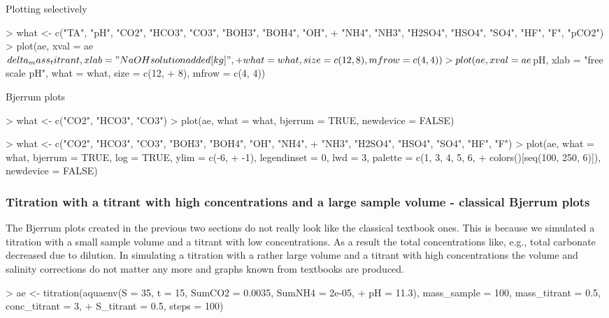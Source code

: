 \documentclass[article,nojss]{jss}
\begin{document}
Plotting selectively
\begin{Schunk}
\begin{Sinput}
> what <- c("TA", "pH", "CO2", "HCO3", "CO3", "BOH3", "BOH4", "OH", 
+     "NH4", "NH3", "H2SO4", "HSO4", "SO4", "HF", "F", "pCO2")
> plot(ae, xval = ae$delta_mass_titrant, xlab = "NaOH solution added [kg]", 
+     what = what, size = c(12, 8), mfrow = c(4, 4))
> plot(ae, xval = ae$pH, xlab = "free scale pH", what = what, size = c(12, 
+     8), mfrow = c(4, 4))
\end{Sinput}
\end{Schunk}

Bjerrum plots
\begin{Schunk}
\begin{Sinput}
> what <- c("CO2", "HCO3", "CO3")
> plot(ae, what = what, bjerrum = TRUE, newdevice = FALSE)
\end{Sinput}
\end{Schunk}

\begin{Schunk}
\begin{Sinput}
> what <- c("CO2", "HCO3", "CO3", "BOH3", "BOH4", "OH", "NH4", 
+     "NH3", "H2SO4", "HSO4", "SO4", "HF", "F")
> plot(ae, what = what, bjerrum = TRUE, log = TRUE, ylim = c(-6, 
+     -1), legendinset = 0, lwd = 3, palette = c(1, 3, 4, 5, 6, 
+     colors()[seq(100, 250, 6)]), newdevice = FALSE)
\end{Sinput}
\end{Schunk}


\subsubsection{Titration with a titrant with high concentrations and a large sample volume - classical Bjerrum plots}
The Bjerrum plots created in the previous two sections do not really look like the classical textbook ones.
This is because we simulated a titration with a small sample volume and a titrant with low concentrations. 
As a result the total concentrations like, e.g., total carbonate decreased due to dilution. 
In simulating a titration with a rather large volume and a titrant with high concentrations the volume and salinity corrections do not matter
any more and graphs known from textbooks \citep[e.g.][]{Zeebe2001} are produced.

\begin{Schunk}
\begin{Sinput}
> ae <- titration(aquaenv(S = 35, t = 15, SumCO2 = 0.0035, SumNH4 = 2e-05, 
+     pH = 11.3), mass_sample = 100, mass_titrant = 0.5, conc_titrant = 3, 
+     S_titrant = 0.5, steps = 100)
\end{Sinput}
\end{Schunk}
\end{document}
